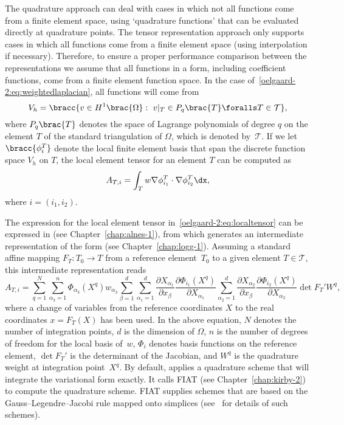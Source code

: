 The quadrature approach can deal with cases in which not all functions
come from a finite element space, using `quadrature functions' that
can be evaluated directly at quadrature points. The tensor
representation approach only supports cases in which all functions
come from a finite element space (using interpolation if necessary).
Therefore, to ensure a proper performance comparison between the
representations we assume that all functions in a form, including
coefficient functions, come from a finite element function space. In
the case of~\eqref{oelgaard-2:eq:weightedlaplacian}, all
functions will come from
%
\begin{equation}
  V_{h} = \bracc{v \in H^{1}\brac{\Omega}: \ v\vert_T \in P_{q}\brac{T}
    \foralls T \in \mathcal{T}},
  \label{oelgaard-2:eq:space_H1}
\end{equation}
%
where $P_{q}\brac{T}$ denotes the space of Lagrange polynomials of
degree $q$ on the element $T$ of the standard triangulation of
$\Omega$, which is denoted by~$\mathcal{T}$.  If we let
$\bracc{\phi^{T}_{i}}$ denote the local finite element basis that span
the discrete function space $V_{h}$ on $T$, the local element tensor
for an element $T$ can be computed as
%
\begin{equation}
  A_{T,i} = \int_{T} w \nabla \phi^{T}_{i_1} \cdot \nabla
  \phi^{T}_{i_2} \dx,
  \label{oelgaard-2:eq:localtensor}
\end{equation}
%
where $i = (i_{1}, i_{2})$.

The expression for the local element tensor
in~\eqref{oelgaard-2:eq:localtensor} can be expressed in \ufl{} (see
Chapter~\ref{chap:alnes-1}), from which \ffc{} generates an
intermediate representation of the form (see
Chapter~\ref{chap:logg-1}).  Assuming a standard affine mapping $F_T :
T_0 \rightarrow T$ from a reference element~$T_{0}$ to a given element
$T \in \mathcal{T}$, this intermediate representation reads
%
\begin{equation}
  A_{T,i}
  =
  \sum_{q=1}^{N}
  \sum_{\alpha_{3}=1}^n
  \Phi_{\alpha_{3}}(X^q)
  w_{\alpha_{3}}
  \sum_{\beta=1}^d
  \sum_{\alpha_1=1}^d
  \frac{\partial X_{\alpha_1}}{\partial x_{\beta}}
  \frac{\partial \Phi_{i_1}(X^q)}{\partial X_{\alpha_1}}
  \sum_{\alpha_2=1}^d
  \frac{\partial X_{\alpha_2}}{\partial x_{\beta}}
  \frac{\partial \Phi_{i_2}(X^q)}{\partial X_{\alpha_2}}
  \det F_T'
  W^q,
\label{oelgaard-2:eq:weightedlaplacian_quadraturerepresentation}
\end{equation}
%
where a change of variables from the reference coordinates $X$ to the
real coordinates $x = F_T(X)$ has been used. In the above equation,
$N$ denotes the number of integration points, $d$ is the dimension of
$\Omega$, $n$ is the number of degrees of freedom for the local basis
of~$w$, $\Phi_{i}$ denotes basis functions on the reference element,
$\det F_T'$ is the determinant of the Jacobian, and $W^q$ is the
quadrature weight at integration point~$X^q$.  By default, \ffc{}
applies a quadrature scheme that will integrate the variational form
exactly.  It calls FIAT (see Chapter~\ref{chap:kirby-2}) to compute
the quadrature scheme.  FIAT supplies schemes that are based on the
Gauss--Legendre--Jacobi rule mapped onto simplices
(see~\citet{KarniadakisSherwin2005} for details of such schemes).

